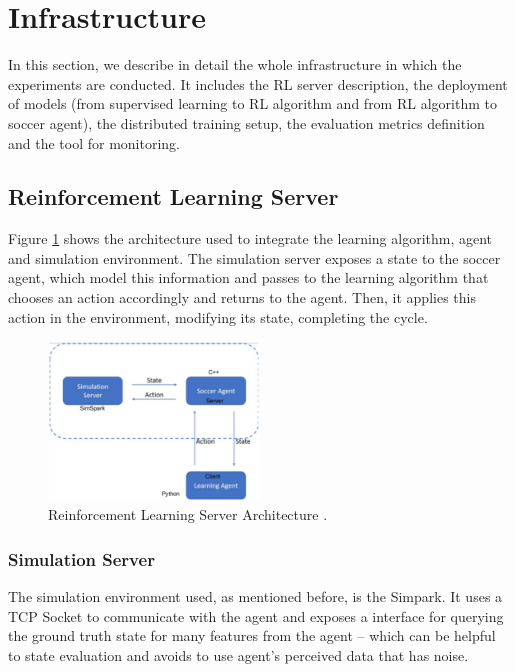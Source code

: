 \section{Infrastructure}
In this section, we describe in detail the whole infrastructure in which the experiments are conducted. It includes the RL server description, the deployment of models (from supervised learning to RL algorithm and from RL algorithm to soccer agent), the distributed training setup, the evaluation metrics definition and the tool for monitoring.

\subsection{Reinforcement Learning Server}\label{rlarchitecture}

Figure \ref{rlserver} shows the architecture used to integrate the learning algorithm, agent and simulation environment. The simulation server exposes a state to the soccer agent, which model this information and passes to the learning algorithm that chooses an action accordingly and returns to the agent. Then, it applies this action in the environment, modifying its state, completing the cycle.

\begin{figure}[!htbp]
	\centering
	\includegraphics[width=0.5\textwidth]{Cap5/rlserver.eps}
	\caption{Reinforcement Learning Server Architecture
		\cite{tgmuzio}.
	}
	\label{rlserver}
\end{figure}

\subsubsection{Simulation Server}

The simulation environment used, as mentioned before, is the Simpark. It uses a TCP Socket to communicate with the agent and exposes a interface for querying the ground truth state for many features from the agent -- which can be helpful to state evaluation and avoids to use agent's perceived data that has noise. 

